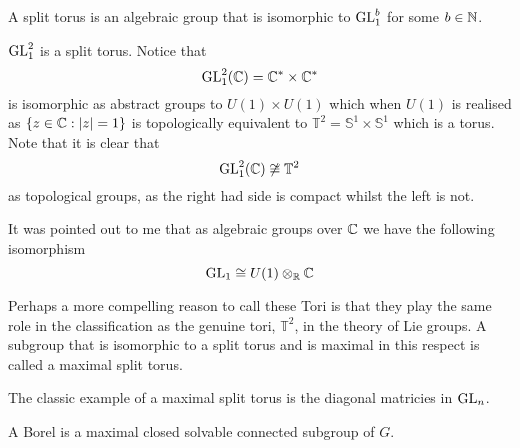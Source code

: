     \begin{definition}
        A split torus is an algebraic group that is isomorphic to \(\operatorname{GL}_1^b\) for some \(b\in\N\).
    \end{definition}

    \begin{example}
        \(\operatorname{GL}^2_1\) is a split torus. Notice that 
        \[\GL^2_1(\C) = \C^\ast\times \C^\ast\]
        is isomorphic as abstract groups to \(U(1)\times U(1)\) which when \(U(1)\) is realised as \(\{z\in \C : |z| = 1\}\) is topologically equivalent to \(\mathbb{T}^2 = \mathbb{S}^1\times \mathbb{S}^1 \) which is a torus. Note that it is clear that 
        \[\GL^2_1(\C) \not\cong \mathbb{T}^2 \]
        as topological groups, as the right had side is compact whilst the left is not.

        It was pointed out to me that as algebraic groups over \(\C\) we have the following isomorphism
        \[\GL_1 \cong U(1)\tensor_\R \C\]
    \end{example}
    
     Perhaps a more compelling reason to call these Tori is that they play the same role in the classification as the genuine tori, \(\mathbb{T}^2\), in the theory of Lie groups.  A subgroup that is isomorphic to a split torus and is maximal in this respect is called a maximal split torus. 
     \begin{example}
        The classic example of a maximal split torus is the diagonal matricies in \(\operatorname{GL}_n\).
     \end{example}

    \begin{definition}
        A Borel is a maximal closed solvable connected subgroup of \(G\).
    \end{definition}

